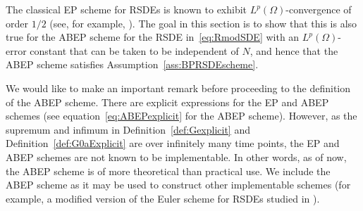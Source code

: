 \documentclass[11pt]{amsart}
\begin{document}
{The classical EP scheme for RSDEs is known to exhibit $L^{p}(\Omega)$-convergence of order $1/2$ (see, for example, \cite{SLOMINSKI1994197}). The goal in this section is to show that this is also true for the ABEP scheme for the RSDE in~\eqref{eq:RmodSDE} with an $L^{p}(\Omega)$-error constant that can be taken to be independent of $N$, and hence that the ABEP scheme satisfies Assumption~\ref{ass:BPRSDEscheme}. 

We would like to make an important remark before proceeding to the definition of the ABEP scheme. There are explicit expressions for the EP and ABEP schemes (see equation~\eqref{eq:ABEPexplicit} for the ABEP scheme). However, as the supremum and infimum in Definition~\ref{def:Gexplicit} and Definition~\ref{def:G0aExplicit} are over infinitely many time points, the EP and ABEP schemes are not known to be implementable.  In other words, as of now, the ABEP scheme is of more theoretical than practical use. We include the ABEP scheme as it may be used to construct other implementable schemes (for example, a modified version of the Euler scheme for RSDEs studied in \cite{MR1341164}).

}
\end{document}

